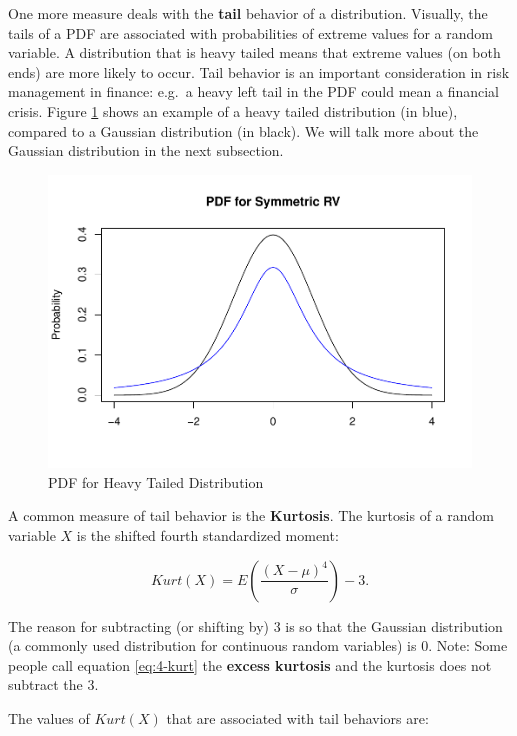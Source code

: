 \documentclass[
]{book}
\begin{document}
One more measure deals with the \textbf{tail} behavior of a distribution. Visually, the tails of a PDF are associated with probabilities of extreme values for a random variable. A distribution that is heavy tailed means that extreme values (on both ends) are more likely to occur. Tail behavior is an important consideration in risk management in finance: e.g.~a heavy left tail in the PDF could mean a financial crisis. Figure \ref{fig:4-kurt} shows an example of a heavy tailed distribution (in blue), compared to a Gaussian distribution (in black). We will talk more about the Gaussian distribution in the next subsection.

\begin{figure}
\centering
\includegraphics{bookdown-demo_files/figure-latex/4-kurt-1.pdf}
\caption{\label{fig:4-kurt}PDF for Heavy Tailed Distribution}
\end{figure}

A common measure of tail behavior is the \textbf{Kurtosis}. The kurtosis of a random variable \(X\) is the shifted fourth standardized moment:

\begin{equation} 
Kurt(X) = E \left(\frac{(X-\mu)^4}{\sigma} \right) - 3.
\label{eq:4-kurt}
\end{equation}

The reason for subtracting (or shifting by) 3 is so that the Gaussian distribution (a commonly used distribution for continuous random variables) is 0. Note: Some people call equation \eqref{eq:4-kurt} the \textbf{excess kurtosis} and the kurtosis does not subtract the 3.

The values of \(Kurt(X)\) that are associated with tail behaviors are:
\end{document}

